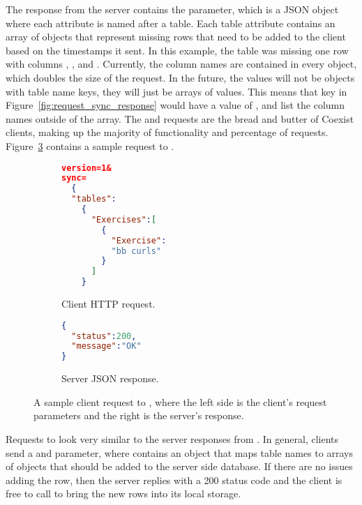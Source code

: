 The response from the server contains the  parameter, which is a
JSON object where each attribute is named after a table. Each table attribute
contains an array of objects that represent missing rows that need to be added
to the client based on the timestamps it sent. In this example, the
 table was missing one row with columns ,
, and . Currently, the column names are contained in
every object, which doubles the size of the request. In the future, the values
will not be objects with table name keys, they will just be arrays of values.
This means that  key in Figure~\ref{fig:request_sync_response}
would have a value of \var{[["bb curls","2013-04-21 04:32:18","0"]]}, and list
the column names outside of the array. The \sync and \create requests are the
bread and butter of Coexist clients, making up the majority of functionality and
percentage of requests. Figure~\ref{fig:request_create} contains a sample
request to \create.

\begin{figure}[h!]
\begin{subfigure}[b]{0.23\textwidth}
\begin{lstlisting}[language=json]
version=1&
sync=
  {
  "tables":
    {
      "Exercises":[
        {
          "Exercise":
          "bb curls"
        }
      ]
    }
\end{lstlisting}
\caption{Client HTTP request.}
\label{fig:gull}
\end{subfigure}%
\begin{subfigure}[b]{0.27\textwidth}
\begin{lstlisting}[language=json]
{
  "status":200,
  "message":"OK"
}
\end{lstlisting}
\caption{Server JSON response.}
\label{fig:tiger}
\end{subfigure}
\caption{A sample client request to \create, where the left side is the client's
request parameters and the right is the server's response.}
\label{fig:request_create} 
\end{figure}


Requests to \create look very similar to the server responses from \sync. In
general, clients send a  and  parameter, where 
contains an object that maps table names to arrays of objects that should be added
to the server side database. If there are no issues adding the row, then the
server replies with a 200 status code and the client is free to call \sync to
bring the new rows into its local storage. 

